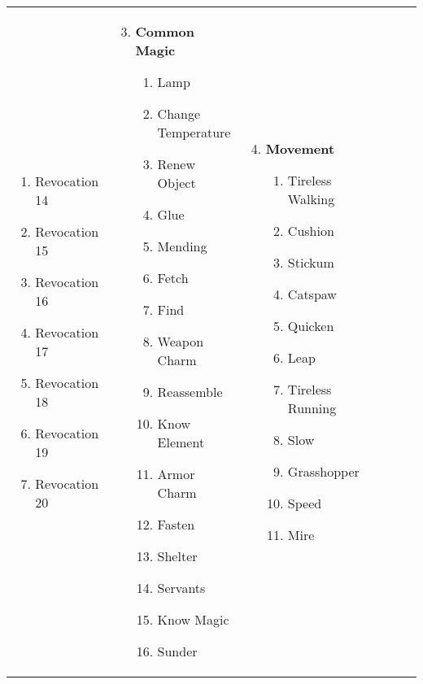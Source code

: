 \begin{tabular}{@{} p{0.25\linewidth} p{0.25\linewidth} p{0.25\linewidth} p{0.25\linewidth}}
\begin{enumerate}
\begin{enumerate}
		\item Revocation 14
		\item Revocation 15
		\item Revocation 16
		\item Revocation 17
		\item Revocation 18
		\item Revocation 19
		\item Revocation 20
	\end{enumerate}
\end{enumerate} &
\begin{enumerate}
	\setcounter{enumi}{2}
	\item \textbf{Common Magic}
	\begin{enumerate}
		\item Lamp
		\item Change Temperature
		\item Renew Object
		\item Glue
		\item Mending
		\item Fetch
		\item Find
		\item Weapon Charm
		\item Reassemble
		\item Know Element
		\item Armor Charm
		\item Fasten
		\item Shelter
		\item Servants
		\item Know Magic
		\item Sunder
	\end{enumerate}
\end{enumerate} &
\begin{enumerate}
	\setcounter{enumi}{3}
	\item \textbf{Movement}
	\begin{enumerate}
		\item Tireless Walking
		\item Cushion
		\item Stickum
		\item Catspaw
		\item Quicken
		\item Leap
		\item Tireless Running
		\item Slow
		\item Grasshopper
		\item Speed
		\item Mire

\end{enumerate}
\end{enumerate}
\end{tabular}
